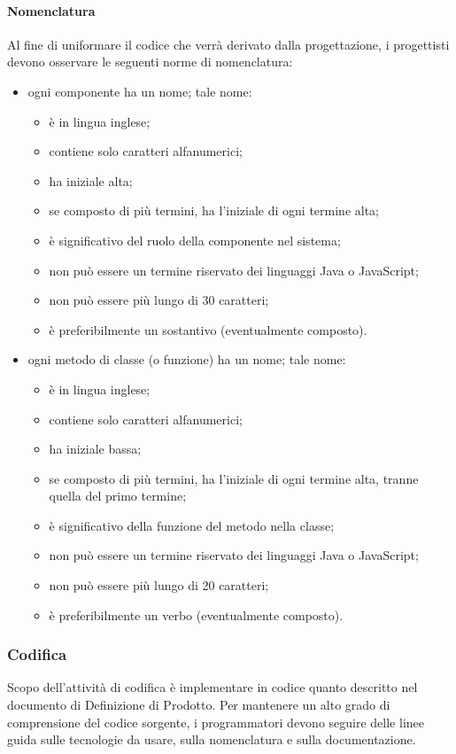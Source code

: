 	\paragraph{Nomenclatura} Al fine di uniformare il codice che verrà derivato dalla progettazione, i progettisti devono osservare le seguenti norme di nomenclatura:
	\begin{itemize}
		\item ogni componente ha un nome; tale nome:
		\begin{itemize}
			\item è in lingua inglese;
			\item contiene solo caratteri alfanumerici;
			\item ha iniziale alta;
			\item se composto di più termini, ha l'iniziale di ogni termine alta;
			\item è significativo del ruolo della componente nel sistema;
			\item non può essere un termine riservato dei linguaggi Java o JavaScript;
			\item non può essere più lungo di 30 caratteri;
			\item è preferibilmente un sostantivo (eventualmente composto).
		\end{itemize}
		\item ogni metodo di classe (o funzione) ha un nome; tale nome:
		\begin{itemize}
			\item è in lingua inglese;
			\item contiene solo caratteri alfanumerici;
			\item ha iniziale bassa;
			\item se composto di più termini, ha l'iniziale di ogni termine alta, tranne quella del primo termine;
			\item è significativo della funzione del metodo nella classe;
			\item non può essere un termine riservato dei linguaggi Java o JavaScript;
			\item non può essere più lungo di 20 caratteri;
			\item è preferibilmente un verbo (eventualmente composto).
		\end{itemize}
	\end{itemize}

	\subsubsection{Codifica} \label{sec:cod}
	Scopo dell'attività di codifica è implementare in codice quanto descritto nel documento di Definizione di Prodotto. Per mantenere un alto grado di comprensione del codice sorgente, i programmatori devono seguire delle linee guida sulle tecnologie da usare, sulla nomenclatura e sulla documentazione.

